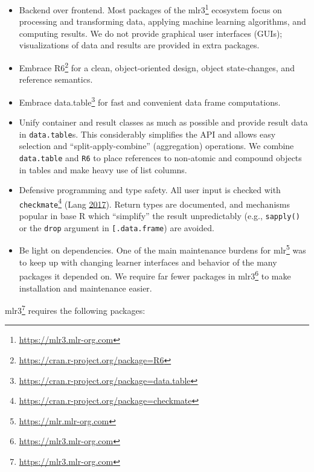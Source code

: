 \documentclass[12pt,]{scrbook}
\providecommand{\tightlist}{%
  \setlength{\itemsep}{0pt}\setlength{\parskip}{0pt}}
\renewcommand{\href}[2]{#2\footnote{\url{#1}}}
\begin{document}
\begin{itemize}
\tightlist
\item
  Backend over frontend.
  Most packages of the \href{https://mlr3.mlr-org.com}{mlr3} ecosystem focus on processing and transforming data, applying machine learning algorithms, and computing results.
  We do not provide graphical user interfaces (GUIs); visualizations of data and results are provided in extra packages.
\item
  Embrace \href{https://cran.r-project.org/package=R6}{R6} for a clean, object-oriented design, object state-changes, and reference semantics.
\item
  Embrace \href{https://cran.r-project.org/package=data.table}{data.table} for fast and convenient data frame computations.
\item
  Unify container and result classes as much as possible and provide result data in \texttt{data.table}s.
  This considerably simplifies the API and allows easy selection and ``split-apply-combine'' (aggregation) operations.
  We combine \texttt{data.table} and \texttt{R6} to place references to non-atomic and compound objects in tables and make heavy use of list columns.
\item
  Defensive programming and type safety.
  All user input is checked with \href{https://cran.r-project.org/package=checkmate}{\texttt{checkmate}} (Lang \protect\hyperlink{ref-checkmate}{2017}).
  Return types are documented, and mechanisms popular in base R which ``simplify'' the result unpredictably (e.g., \texttt{sapply()} or the \texttt{drop} argument in \texttt{{[}.data.frame}) are avoided.
\item
  Be light on dependencies.
  One of the main maintenance burdens for \href{https://mlr.mlr-org.com}{mlr} was to keep up with changing learner interfaces and behavior of the many packages it depended on.
  We require far fewer packages in \href{https://mlr3.mlr-org.com}{mlr3} to make installation and maintenance easier.
\end{itemize}

\href{https://mlr3.mlr-org.com}{mlr3} requires the following packages:
\end{document}

